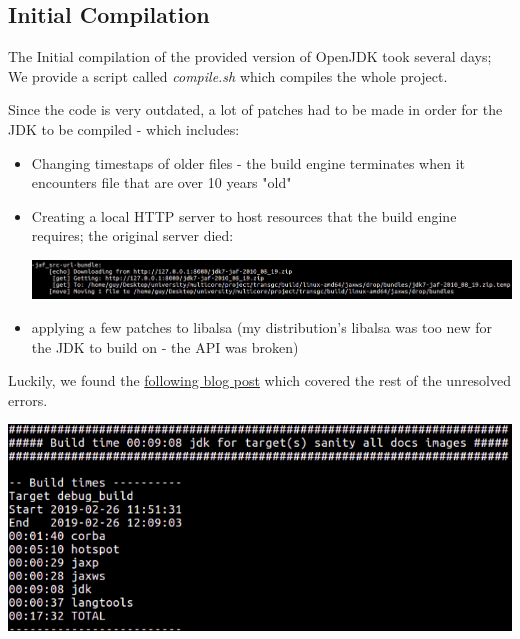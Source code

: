 \documentclass{article}
\begin{document}
  \subsection{Initial Compilation}
  The Initial compilation of the provided version of OpenJDK took several days; We provide a script called \textit{compile.sh} which compiles the whole project.
  
  Since the code is very outdated, a lot of patches had to be made in order for the JDK to be compiled - which includes:
  \begin{itemize}
    \item Changing timestaps of older files - the build engine terminates when it encounters file that are over 10 years "old"
    \item Creating a local HTTP server to host resources that the build engine requires; the original server died:

    \includegraphics[width=\textwidth]{local_http_server.png}
    \item applying a few patches to libalsa (my distribution's libalsa was too new for the JDK to build on - the API was broken)
  \end{itemize}

  Luckily, we found the \href{http://www.voidcn.com/article/p-zayqisji-va.html}{following blog post} which covered the rest of the unresolved errors.

  \includegraphics[width=\textwidth]{initial_build.png}

  \newpage
\end{document}
